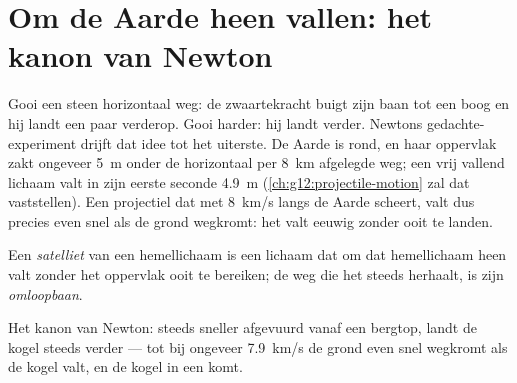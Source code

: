\section{Om de Aarde heen vallen: het kanon van Newton}

Gooi een steen horizontaal weg: de zwaartekracht buigt zijn baan tot een
boog en hij landt een paar  verderop. Gooi harder: hij landt verder.
Newtons gedachte-experiment drijft dat idee tot het uiterste. De Aarde is
rond, en haar oppervlak zakt ongeveer \qty{5}{m} onder de horizontaal per
\qty{8}{km} afgelegde weg; een vrij vallend lichaam valt in zijn eerste
seconde \qty{4.9}{m} (\cref{ch:g12:projectile-motion} zal dat vaststellen).
Een projectiel dat met \qty{8}{km/s} langs de Aarde scheert, valt dus
precies even snel als de grond wegkromt: het valt eeuwig zonder ooit te
landen.

\begin{definition}\label{def:g10:universal-gravitation:satellite}
Een \emph{satelliet} van een hemellichaam is een lichaam
dat om dat hemellichaam heen valt zonder het oppervlak ooit te bereiken;
de weg die het steeds herhaalt, is zijn \emph{omloopbaan}.
\end{definition}

\begin{omfigure}

{\small Het kanon van Newton: steeds sneller afgevuurd vanaf een
bergtop, landt de kogel steeds verder --- tot bij ongeveer
\qty{7.9}{km/s} de grond even snel wegkromt als de kogel valt, en de
kogel in een  komt.}
\end{omfigure}


